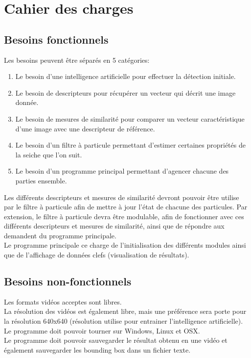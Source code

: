 




\section{Cahier des charges}

\subsection{Besoins fonctionnels}
Les besoins peuvent être séparés en 5 catégories:
\begin{enumerate}
	\item Le besoin d'une intelligence artificielle pour effectuer la détection initiale.
	\item Le besoin de descripteurs pour récupérer un vecteur qui décrit une image donnée.
	\item Le besoin de mesures de similarité pour comparer un vecteur caractéristique d'une image avec une descripteur de référence.
	\item Le besoin d'un filtre à particule permettant d'estimer certaines propriétés de la seiche que l'on suit.
	\item Le besoin d'un programme principal permettant d'agencer chacune des parties ensemble.\\
\end{enumerate}

Les différents descripteurs et mesures de similarité devront pouvoir être utilise par le filtre à particule afin de mettre à jour l'état de chacune des particules. Par extension, le filtre à particule devra être modulable, afin de fonctionner avec ces différents descripteurs et mesures de similarité, ainsi que de répondre aux demandent du programme principale.\\
Le programme principale ce charge de l'initialisation des différents modules ainsi que de l'affichage de données clefs (visualisation de  résultats).\\

\subsection{Besoins non-fonctionnels}
Les formats vidéos acceptes sont libres.\\
La résolution des vidéos est également libre, mais une préférence sera porte pour la résolution 640x640 (résolution utilise pour entrainer l'intelligence artificielle).\\
Le programme doit pouvoir tourner sur Windows, Linux et OSX.\\
Le programme doit pouvoir sauvegarder le résultat obtenu en une vidéo et également sauvegarder les bounding box dans un fichier texte.\\

